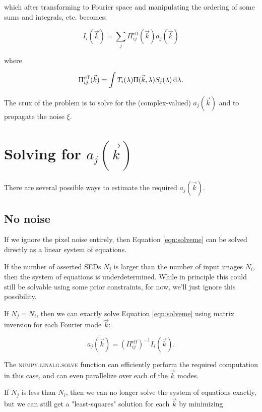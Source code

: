\documentclass{article}
\begin{document}
which after transforming to Fourier space and manipulating the ordering of some sums and integrals,
etc. becomes:

\begin{equation}
  \label{eqn:solveme}
  I_i(\vec{k}) = \sum_j \Pi^\mathrm{eff}_{ij}(\vec{k}) a_j(\vec{k})
\end{equation}

where

\begin{equation}
  \Pi^\mathrm{eff}_{ij}(\vec{k}) = \int T_i(\lambda) \Pi(\vec{k}, \lambda) S_j(\lambda) \dif{\lambda}.
\end{equation}

The crux of the problem is to solve for the (complex-valued) $a_j(\vec{k})$ and to propagate the
noise $\xi$.

\section{Solving for $a_j(\vec{k})$}

There are several possible ways to estimate the required $a_j(\vec{k})$.

\subsection{No noise}

If we ignore the pixel noise entirely, then Equation \ref{eqn:solveme} can be solved directly as a
linear system of equations.

If the number of asserted SEDs $N_j$ is larger than the number of input images $N_i$, then the
system of equations is underdetermined.  While in principle this could still be solvable using some
prior constraints, for now, we'll just ignore this possibility.

If $N_j = N_i$, then we can exactly solve Equation \ref{eqn:solveme} using matrix inversion for each
Fourier mode $\vec{k}$:

\begin{equation}
  a_j(\vec{k}) = (\Pi^\mathrm{eff}_{ij})^{-1} I_i(\vec{k}).
\end{equation}

The \textsc{numpy.linalg.solve} function can efficiently perform the required computation in this
case, and can even parallelize over each of the $\vec{k}$ modes.

If $N_j$ is less than $N_i$, then we can no longer solve the system of equations exactly, but we can
still get a "least-squares" solution for each $\vec{k}$ by minimizing
\end{document}

